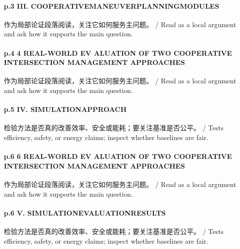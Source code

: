 \documentclass[UTF8,a4paper,11pt,fontset=fandol]{ctexart}
\begin{document}
\paragraph{p.3 III. COOPERATIVEMANEUVERPLANNINGMODULES}作为局部论证段落阅读，关注它如何服务主问题。 / Read as a local argument and ask how it supports the main question.

\paragraph{p.4 4 REAL-WORLD EV ALUATION OF TWO COOPERATIVE INTERSECTION MANAGEMENT APPROACHES}作为局部论证段落阅读，关注它如何服务主问题。 / Read as a local argument and ask how it supports the main question.

\paragraph{p.5 IV. SIMULATIONAPPROACH}检验方法是否真的改善效率、安全或能耗；要关注基准是否公平。 / Tests efficiency, safety, or energy claims; inspect whether baselines are fair.

\paragraph{p.6 6 REAL-WORLD EV ALUATION OF TWO COOPERATIVE INTERSECTION MANAGEMENT APPROACHES}作为局部论证段落阅读，关注它如何服务主问题。 / Read as a local argument and ask how it supports the main question.

\paragraph{p.6 V. SIMULATIONEVALUATIONRESULTS}检验方法是否真的改善效率、安全或能耗；要关注基准是否公平。 / Tests efficiency, safety, or energy claims; inspect whether baselines are fair.
\end{document}
